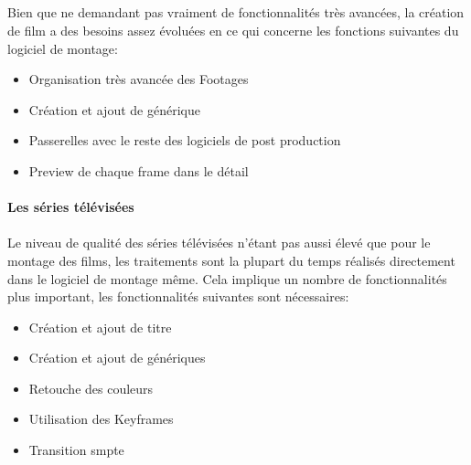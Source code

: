 \subparagraph{}

Bien que ne demandant pas vraiment de fonctionnalités très avancées,
la création de film a des besoins assez évoluées en ce qui concerne
les fonctions suivantes du logiciel de montage:

\begin{itemize} \setlength{\itemsep}{2mm}

  \item{Organisation très avancée des Footages}

  \item{Création et ajout de générique}

  \item{Passerelles avec le reste des logiciels de post production}

  \item{Preview de chaque frame dans le détail}

\end{itemize}


\newpage\paragraph {Les séries télévisées}

\paragraph{}

Le niveau de qualité des séries télévisées n'étant pas aussi élevé
que pour le montage des films, les traitements sont la plupart du temps
réalisés directement dans le logiciel de montage même. Cela implique
un nombre de fonctionnalités plus important, les fonctionnalités
suivantes sont nécessaires:

\begin{itemize} \setlength{\itemsep}{2mm}

  \item{Création et ajout de titre}

  \item{Création et ajout de génériques}

  \item{Retouche des couleurs}

  \item{Utilisation des Keyframes}

  \item{Transition smpte }

\end{itemize}

